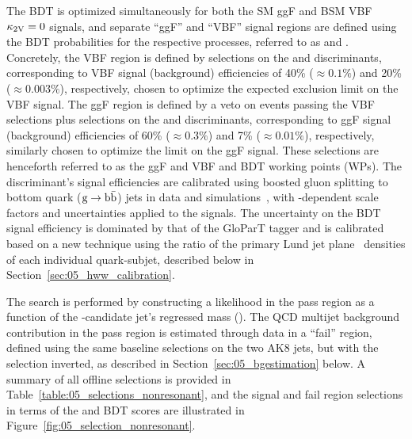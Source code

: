 The BDT is optimized simultaneously for both the SM ggF and BSM VBF $\kappa_{2\textrm{V}}=0$ signals, and separate ``ggF'' and ``VBF'' signal regions are defined using the BDT probabilities for the respective processes, referred to as \ggfbdt and \vbfbdt.
Concretely, the VBF region is defined by selections on the \TXbb and \vbfbdt discriminants, corresponding to VBF signal (background) efficiencies of 40\% ($\approx 0.1\%$) and 20\% ($\approx 0.003\%$), respectively, chosen to optimize the expected exclusion limit on the VBF signal.
The ggF region is defined by a veto on events passing the VBF selections plus selections on the \TXbb and \ggfbdt discriminants, corresponding to ggF signal (background) efficiencies of 60\% ($\approx 0.3\%$) and 7\% ($\approx 0.01\%$), respectively, similarly chosen to optimize the limit on the ggF signal.
These selections are henceforth referred to as the ggF and VBF \TXbb and BDT working points (WPs).
The \TXbb discriminant's signal efficiencies are calibrated using boosted gluon splitting to bottom quark ($\textrm{g}\to\textrm{b}\bar{\textrm{b}}$) jets in data and simulations~\cite{CMS:2023tlv}, with \pt-dependent scale factors and uncertainties applied to the \HH signals.
The uncertainty on the BDT signal efficiency is dominated by that of the GloParT tagger and is calibrated based on a new technique using the ratio of the primary Lund jet plane~\cite{Dreyer:2018nbf} densities of each individual quark-subjet, described below in Section~\ref{sec:05_hww_calibration}.

The search is performed by constructing a likelihood in the pass region as a function of the \hbb-candidate jet's regressed mass (\mregbb).
The QCD multijet background contribution in the pass region is estimated through data in a ``fail'' region, defined using the same baseline selections on the two AK8 jets, but with the \TXbb selection inverted, as described in Section~\ref{sec:05_bgestimation} below.
A summary of all offline selections is provided in Table~\ref{table:05_selections_nonresonant}, and the signal and fail region selections in terms of the \TXbbbb and BDT scores are illustrated in Figure~\ref{fig:05_selection_nonresonant}.


